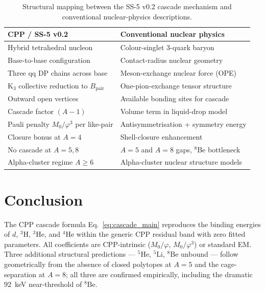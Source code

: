 \documentclass[11pt,letterpaper]{article}
\newcommand{\phig}{\varphi}
\newcommand{\Mzero}{M_0}
\newcommand{\Bpair}{B_{\mathrm{pair}}}
\begin{document}
\begin{table}[H]
\centering
\caption{Structural mapping between the SS-5 v0.2 cascade mechanism and conventional nuclear-physics descriptions.}
\label{tab:mapping}
\begin{tabular}{@{}p{} p{}@{}}
\toprule
\textbf{CPP / SS-5 v0.2} & \textbf{Conventional nuclear physics} \\
\midrule
Hybrid tetrahedral nucleon & Colour-singlet 3-quark baryon \\[3pt]
Base-to-base configuration & Contact-radius nuclear geometry \\[3pt]
Three qq DP chains across base & Meson-exchange nuclear force (OPE) \\[3pt]
K$_3$ collective reduction to $\Bpair$ & One-pion-exchange tensor structure \\[3pt]
Outward open vertices & Available bonding sites for cascade \\[3pt]
Cascade factor $(A-1)$ & Volume term in liquid-drop model \\[3pt]
Pauli penalty $\Mzero/\phig^3$ per like-pair & Antisymmetrisation + symmetry energy \\[3pt]
Closure bonus at $A=4$ & Shell-closure enhancement \\[3pt]
No cascade at $A=5,8$ & $A=5$ and $A=8$ gaps, $^{8}$Be bottleneck \\[3pt]
Alpha-cluster regime $A \geq 6$ & Alpha-cluster nuclear structure models \\
\bottomrule
\end{tabular}
\end{table}

\section{Conclusion}
\label{sec:conclusion}

The CPP cascade formula Eq.~\eqref{eq:cascade_main} reproduces the binding energies of $d$, ${}^{3}\mathrm{H}$, ${}^{3}\mathrm{He}$, and ${}^{4}\mathrm{He}$ within the generic CPP residual band with zero fitted parameters. All coefficients are CPP-intrinsic ($\Mzero/\phig$, $\Mzero/\phig^{3}$) or standard EM. Three additional structural predictions --- ${}^{5}\mathrm{He}$, ${}^{5}\mathrm{Li}$, ${}^{8}\mathrm{Be}$ unbound --- follow geometrically from the absence of closed polytopes at $A=5$ and the cage-separation at $A=8$; all three are confirmed empirically, including the dramatic $92$~keV near-threshold of ${}^{8}\mathrm{Be}$.
\end{document}
